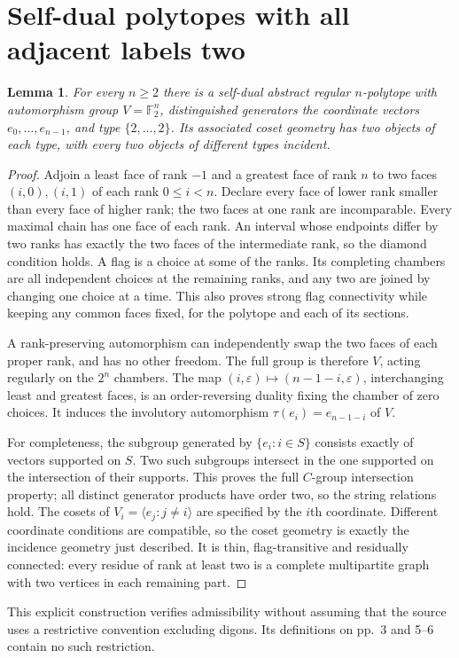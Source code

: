 \documentclass[11pt,a4paper]{article}
\newtheorem{lemma}[proposition]{Lemma}
\newcommand{\F}{\mathbb F}
\begin{document}
\section{Self-dual polytopes with all adjacent labels two}
\begin{lemma}\label{l:digon}
For every $n\geq2$ there is a self-dual abstract regular $n$-polytope with
automorphism group $V=\F_2^n$, distinguished generators the coordinate
vectors $e_0,\ldots,e_{n-1}$, and type $\{2,\ldots,2\}$.
Its associated coset geometry has two objects of each type, with every
two objects of different types incident.
\end{lemma}
\begin{proof}
Adjoin a least face of rank $-1$ and a greatest face of rank $n$ to two
faces $(i,0),(i,1)$ of each rank $0\leq i<n$. Declare every face of lower
rank smaller than every face of higher rank; the two faces at one rank
are incomparable. Every maximal chain has one face of each rank. An
interval whose endpoints differ by two ranks has exactly the two faces
of the intermediate rank, so the diamond condition holds. A flag is a
choice at some of the ranks. Its completing chambers are all independent
choices at the remaining ranks, and any two are joined by changing one
choice at a time. This also proves strong flag connectivity while keeping
any common faces fixed, for the polytope and each of its sections.

A rank-preserving automorphism can independently swap the two faces of
each proper rank, and has no other freedom. The full group is therefore
$V$, acting regularly on the $2^n$ chambers. The map
$(i,\varepsilon)\mapsto(n-1-i,\varepsilon)$, interchanging least and
greatest faces, is an order-reversing duality fixing the chamber of zero
choices. It induces the involutory automorphism
$\tau(e_i)=e_{n-1-i}$ of $V$.

For completeness, the subgroup generated by $\{e_i:i\in S\}$ consists
exactly of vectors supported on $S$. Two such subgroups intersect in the
one supported on the intersection of their supports. This proves the full
$C$-group intersection property; all distinct generator products have
order two, so the string relations hold. The cosets of
$V_i=\langle e_j:j\ne i\rangle$ are specified by the $i$th coordinate.
Different coordinate conditions are compatible, so the coset geometry is
exactly the incidence geometry just described. It is thin, flag-transitive
and residually connected: every residue of rank at least two is a complete
multipartite graph with two vertices in each remaining part.
\end{proof}
This explicit construction verifies admissibility without assuming that
the source uses a restrictive convention excluding digons. Its definitions
on pp.~3 and 5--6 contain no such restriction.
\end{document}
